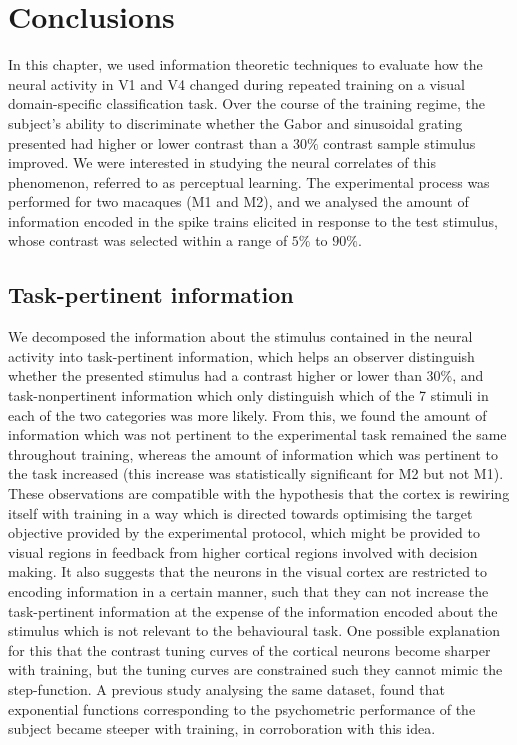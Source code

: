\section{Conclusions}

In this chapter, we used information theoretic techniques to evaluate how the neural activity in \ac{V1} and \ac{V4} changed during repeated training on a visual domain-specific classification task.
Over the course of the training regime, the subject's ability to discriminate whether the Gabor and sinusoidal grating presented had higher or lower contrast than a $30\%$ contrast sample stimulus improved.
We were interested in studying the neural correlates of this phenomenon, referred to as perceptual learning.
The experimental process was performed for two macaques (\ac{M1} and \ac{M2}), and we analysed the amount of information encoded in the spike trains elicited in response to the test stimulus, whose contrast was selected within a range of $5\%$ to $90\%$.


\subsection{Task-pertinent information}

We decomposed the information about the stimulus contained in the neural activity into task-pertinent information, which helps an observer distinguish whether the presented stimulus had a contrast higher or lower than $30\%$, and task-nonpertinent information which only distinguish which of the \num{7} stimuli in each of the two categories was more likely.
From this, we found the amount of information which was not pertinent to the experimental task remained the same throughout training, whereas the amount of information which was pertinent to the task increased (this increase was statistically significant for \ac{M2} but not \ac{M1}).
These observations are compatible with the hypothesis that the cortex is rewiring itself with training in a way which is directed towards optimising the target objective provided by the experimental protocol, which might be provided to visual regions in feedback from higher cortical regions involved with decision making.
It also suggests that the neurons in the visual cortex are restricted to encoding information in a certain manner, such that they can not increase the task-pertinent information at the expense of the information encoded about the stimulus which is not relevant to the behavioural task.
One possible explanation for this that the contrast tuning curves of the cortical neurons become sharper with training, but the tuning curves are constrained such they cannot mimic the step-function.
A previous study analysing the same dataset, \citet{Chen2013} found that exponential functions corresponding to the psychometric performance of the subject became steeper with training, in corroboration with this idea.


